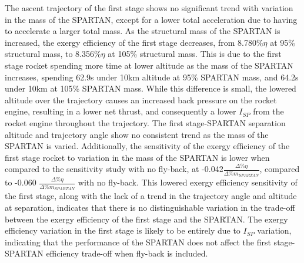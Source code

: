 The ascent trajectory of the first stage shows no significant trend with variation in the mass of the SPARTAN, except for a lower total acceleration due to having to accelerate a larger total mass.
As the structural mass of the SPARTAN is increased, the exergy efficiency of the first stage decreases, from 8.780\%$\eta$ at 95\% structural mass, to 8.356\%$\eta$ at 105\% structural mass. This is due to the first stage rocket spending more time at lower altitude as the mass of the SPARTAN increases, spending 62.9s under 10km altitude at 95\% SPARTAN mass, and 64.2s under 10km at 105\% SPARTAN mass. While this difference is small, the lowered altitude over the trajectory causes an increased back pressure on the rocket engine, resulting in a lower net thrust, and consequently a lower $I_{SP}$ from the rocket engine throughout the trajectory. 
 The first stage-SPARTAN separation altitude and trajectory angle show no consistent trend as the mass of the SPARTAN is varied. 
 Additionally, the sensitivity of the exergy efficiency of the first stage rocket to variation in the mass of the SPARTAN is lower when compared to the sensitivity study with no fly-back, at -0.042$\frac{\Delta \%\eta}{\Delta\% m_{SPARTAN}}$, compared to -0.060 $\frac{\Delta \%\eta}{\Delta\% m_{SPARTAN}}$ with no fly-back. This lowered exergy efficiency sensitivity of the first stage, along with the lack of a trend in the trajectory angle and altitude at separation, indicates that there is no distinguishable variation in the trade-off between the exergy efficiency of the first stage and the SPARTAN. The exergy efficiency variation in the first stage is likely to be entirely due to $I_{SP}$ variation, indicating that the performance of the SPARTAN does not affect the first stage-SPARTAN efficiency trade-off when fly-back is included. 
 
